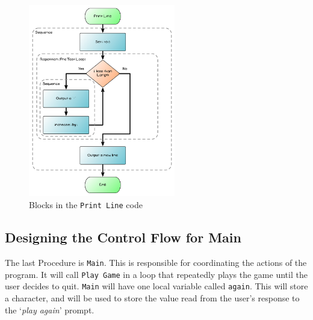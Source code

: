 \begin{figure}[htbp]
   \centering
   \includegraphics[width=0.57\textwidth]{./topics/control-flow/diagrams/PrintLine1} 
   \caption{Blocks in the \texttt{Print Line} code}
   \label{fig:print-line-diag-1}
\end{figure}





\clearpage
\subsection{Designing the Control Flow for Main} %
\label{sub:designing_the_control_flow_for_main}

The last Procedure is \texttt{Main}. This is responsible for coordinating the actions of the program. It will call \texttt{Play Game} in a loop that repeatedly plays the game until the user decides to quit. \texttt{Main} will have one local variable called \texttt{again}. This will store a character, and will be used to store the value read from the user's response to the `\emph{play again}' prompt.

